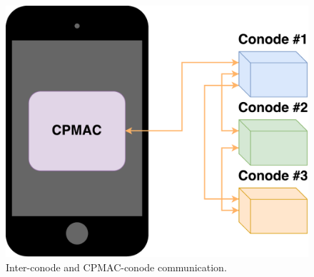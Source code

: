 \begin{figure}[h]
\includegraphics[scale=.5]{graphic/communication.pdf}
\centering
\caption{Inter-conode and CPMAC-conode communication.}
\end{figure}
